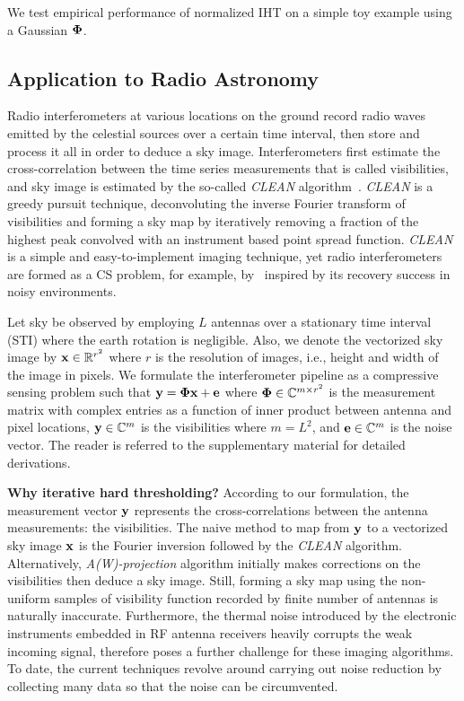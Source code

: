 \documentclass{article}
\begin{document}
We test empirical performance of normalized IHT on a simple toy example using a Gaussian ${\bf \Phi}$. 
















\subsection{Application to Radio Astronomy}
Radio interferometers at various locations on the ground record radio waves emitted by the celestial sources over a certain time interval, then store and process it all in order to deduce a sky image. Interferometers first estimate the cross-correlation between the time series measurements that is called visibilities, and sky image is estimated by the so-called {\it CLEAN} algorithm~\cite{hogbom1974clean}. {\it CLEAN} is a greedy pursuit technique, deconvoluting the inverse Fourier transform of visibilities and forming a sky map by iteratively removing a fraction of the highest peak convolved with an instrument based point spread function. {\it CLEAN} is a simple and easy-to-implement imaging technique, yet radio interferometers are formed as a CS problem, for example, by~\cite{wiaux2009csforra, wenger2010csforra, li2011deconvolution} inspired by its recovery success in noisy environments.

Let sky be observed by employing $L$ antennas over a stationary time interval (STI) where the earth rotation is negligible. Also, we denote the vectorized sky image by ${\bf x} \in \mathbb{R}^{r^2}$ where $r$ is the resolution of images, i.e., height and width of the image in pixels. We formulate the interferometer pipeline as a compressive sensing problem such that ${\bf y} = {\bf \Phi} {\bf x} + {\bf e}$ where ${\bf \Phi} \in \mathbb{C}^{m\times r^2}$ is the measurement matrix with complex entries as a function of inner product between antenna and pixel locations, ${\bf y} \in \mathbb{C}^{m}$ is the visibilities where $m=L^2$, and ${\bf e} \in \mathbb{C}^m$ is the noise vector. The reader is referred to the supplementary material for detailed derivations. 


{\bf Why iterative hard thresholding?} According to our formulation, the measurement vector ${\bf y}$ represents the cross-correlations between the antenna measurements: the visibilities. The naive method to map from ${\bf y}$ to a vectorized sky image ${\bf x}$ is the Fourier inversion followed by the {\it CLEAN} algorithm. Alternatively, {\it A(W)-projection} algorithm initially makes corrections on the visibilities then deduce a sky image. Still, forming a sky map using the non-uniform samples of visibility function recorded by finite number of antennas is naturally inaccurate. Furthermore, the thermal noise introduced by the electronic instruments embedded in RF antenna receivers heavily corrupts the weak incoming signal, therefore poses a further challenge for these imaging algorithms. To date, the current techniques revolve around carrying out noise reduction by collecting many data so that the noise can be circumvented.
\end{document}
